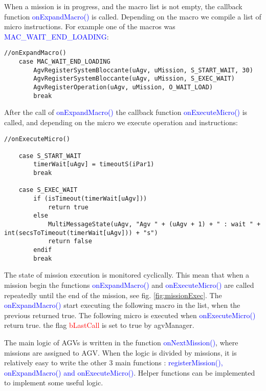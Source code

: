 When a mission is in progress, and the macro list is not empty, the callback function \textcolor{blue}{onExpandMacro()} is called. Depending on the macro we compile a list of micro instructions. For example one of the macros was \textcolor{blue}{MAC\_WAIT\_END\_LOADING}:

\begin{lstlisting}[caption= onExpandMacro() micro list is composed]
	//onExpandMacro()
	case MAC_WAIT_END_LOADING
		AgvRegisterSystemBloccante(uAgv, uMission, S_START_WAIT, 30)
		AgvRegisterSystemBloccante(uAgv, uMission, S_EXEC_WAIT)
		AgvRegisterOperation(uAgv, uMission, O_WAIT_LOAD)
		break
\end{lstlisting}

After the call of \textcolor{blue}{onExpandMacro()} the callback function \textcolor{blue}{onExecuteMicro()} is called, and depending on the micro we execute operation and instructions:

\begin{lstlisting}[caption=onExecuteMicro() micro are aexecuted]
	//onExecuteMicro()
	
	case S_START_WAIT
		timerWait[uAgv] = timeoutS(iPar1)
		break
	
	case S_EXEC_WAIT
		if (isTimeout(timerWait[uAgv]))
			return true
		else
			MultiMessageState(uAgv, "Agv " + (uAgv + 1) + " : wait " + int(secsToTimeout(timerWait[uAgv])) + "s")
			return false
		endif
		break
\end{lstlisting}

The state of mission execution is monitored cyclically. This mean that when a mission begin the functions \textcolor{blue}{onExpandMacro()} and \textcolor{blue}{onExecuteMicro()} are called repeatedly until the end of the mission, see fig. \ref{fig:missionExec}.
The \textcolor{blue}{onExpandMacro()} start executing the following macro in the list, when the previous returned true. The following micro is executed when \textcolor{blue}{onExecuteMicro()} return true. the flag \textcolor{red}{bLastCall} is set to true by agvManager.

The main logic of AGVs is written in the function \textcolor{blue}{onNextMission()}, where missions are assigned to AGV. When the logic is divided by missions, it is relatively easy to write the other 3 main functions : \textcolor{blue}{ registerMission(), onExpandMacro() and onExecuteMicro()}. Helper functions can be implemented to implement some useful logic.